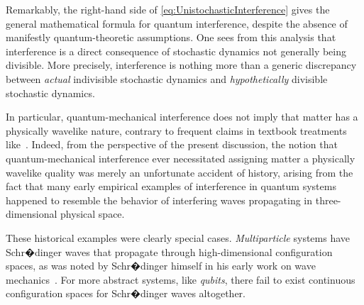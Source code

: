 \documentclass[12pt,english,prl,superscriptaddress,nobibnotes,nofootinbib]{revtex4-2}
\begin{document}
Remarkably, the right-hand side of \eqref{eq:UnistochasticInterference}
gives the general mathematical formula for quantum interference, despite
the absence of manifestly quantum-theoretic assumptions. One sees
from this analysis that interference is a direct consequence of stochastic
dynamics not generally being divisible. More precisely, interference
is nothing more than a generic discrepancy between \emph{actual} indivisible
stochastic dynamics and \emph{hypothetically} divisible stochastic
dynamics. 

In particular, quantum-mechanical interference does not imply that
matter has a physically wavelike nature, contrary to frequent claims
in textbook treatments like~\citep{FeynmanLeightonSands:1965tflopv3}.
Indeed, from the perspective of the present discussion, the notion
that quantum-mechanical interference ever necessitated assigning matter
a physically wavelike quality was merely an unfortunate accident of
history, arising from the fact that many early empirical examples
of interference in quantum systems happened to resemble the behavior
of interfering waves propagating in three-dimensional physical space.

These historical examples were clearly special cases. \emph{Multiparticle}
systems have Schr�dinger waves that propagate through high-dimensional
configuration spaces, as was noted by Schr�dinger himself in his early
work on wave mechanics~\citep{Schrodinger:1926autotmoaam}. For more
abstract systems, like \emph{qubits}, there fail to exist continuous
configuration spaces for Schr�dinger waves altogether.
\end{document}
